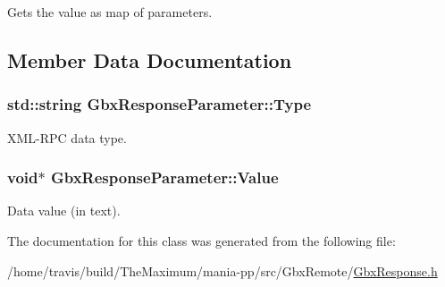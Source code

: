 Gets the value as map of parameters. 



\subsection{Member Data Documentation}
\hypertarget{classGbxResponseParameter_aa1700ca65fa2526b112be24b5c0bdbf4}{
\subsubsection[{Type}]{\setlength{\rightskip}{0pt plus 5cm}std\-::string Gbx\-Response\-Parameter\-::\-Type}}\label{classGbxResponseParameter_aa1700ca65fa2526b112be24b5c0bdbf4}


X\-M\-L-\/\-R\-P\-C data type. 

\hypertarget{classGbxResponseParameter_afcbf7243976fef177ce4c6e8480a4ce3}{
\subsubsection[{Value}]{\setlength{\rightskip}{0pt plus 5cm}void$\ast$ Gbx\-Response\-Parameter\-::\-Value}}\label{classGbxResponseParameter_afcbf7243976fef177ce4c6e8480a4ce3}


Data value (in text). 



The documentation for this class was generated from the following file\-:\begin{DoxyCompactItemize}
\item 
/home/travis/build/\-The\-Maximum/mania-\/pp/src/\-Gbx\-Remote/\hyperlink{GbxResponse_8h}{Gbx\-Response.\-h}\end{DoxyCompactItemize}
